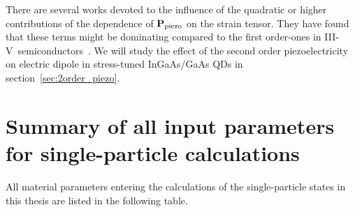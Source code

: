 There are several works devoted to the influence of the quadratic or higher contributions of the dependence of $\mathbf{P}_{{\rm piezo}}$ on the strain tensor. They have found that these terms might be dominating compared to the first order-ones in III-V~semiconductors~\citep{Bester,Bester:06,Beya-Wakata2011}. We will study the effect of the second order piezoelectricity on electric dipole in stress-tuned InGaAs/GaAs QDs in section~\ref{sec:2order_piezo}.














\section{Summary of all input parameters for single-particle calculations}
\label{Secsumparam}

All material parameters entering the calculations of the single-particle states in this thesis are listed in the following table.

